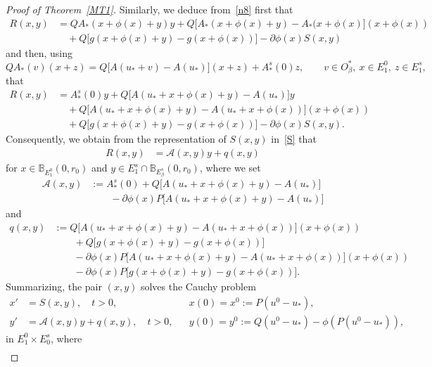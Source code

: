 \documentclass[reqno,11pt]{amsart}
\numberwithin{equation}{section}
\theoremstyle{remark}
\begin{document}
\begin{proof}[Proof of Theorem~\ref{MT1}]
Similarly, we deduce from~\eqref{n8} first that
\begin{align*}
R(x,y)&=Q A_*(x+\phi(x)+y)y+Q\big[A_*(x+\phi(x)+y)-A_*(x+\phi(x)\big](x+\phi(x))\\
&\quad+Q\big[g(x+\phi(x)+y)-g(x+\phi(x))\big]-\partial\phi(x) S(x,y)
\end{align*}
and then, using 
$$
QA_*(v)(x+z)=Q\big[A(u_*+v)-A(u_*)\big](x+z)+A_*^s(0)z, \qquad v\in O_\beta^*,\ x\in E_1^0, \ z\in E_1^s,
$$
 that
\begin{align*}
R(x,y)&=A_*^s(0)y+Q\big[A(u_*+x+\phi(x)+y)-A(u_*)\big]y\\
&\quad+Q\big[A(u_*+x+\phi(x)+y)-A(u_*+x+\phi(x))\big](x+\phi(x))\\
&\quad+Q\big[g(x+\phi(x)+y)-g(x+\phi(x))\big]-\partial\phi(x) S(x,y).
\end{align*}
Consequently, we obtain from the representation of $S(x,y)$ in~\eqref{S} that
\begin{align*}
R(x,y)&=\mathcal{A}(x,y)y+q(x,y)
\end{align*}
for $x\in \mathbb{B}_{E_1^0}(0,r_0)$ and  $y\in E_1^s\cap\mathbb{B}_{E_\beta^s}(0,r_0)$,
where we set
\begin{equation}\label{mcA}
\begin{split}
\mathcal{A}(x,y)&:=A_*^s(0)+Q\big[A(u_*+x+\phi(x)+y)-A(u_*)\big]\\
&\qquad -\partial\phi(x)P\big[A(u_*+x+\phi(x)+y)-A(u_*)\big]
\end{split}
\end{equation}
and
\begin{equation}\label{q}
\begin{split}
q(x,y)&:=Q\big[A(u_*+x+\phi(x)+y)-A(u_*+x+\phi(x))\big](x+\phi(x))\\
&\qquad+Q\big[g(x+\phi(x)+y)-g(x+\phi(x))\big]\\
&\qquad -\partial\phi(x) P\big[A(u_*+x+\phi(x)+y)-A(u_*+x+\phi(x))\big](x+\phi(x))\\
&\qquad -\partial\phi(x)P\big[g(x+\phi(x)+y)-g(x+\phi(x))\big].
\end{split}
\end{equation}
Summarizing,  the pair $(x,y)$ solves the Cauchy problem 
\begin{align}
x'&=S(x,y), \quad t>0,   && x(0)=x^0:= P(u^0-u_*),\label{xeqs}\\
y'&=\mathcal{A}(x,y)y+q(x,y), \quad   t>0, && y(0)=y^0:=Q(u^0-u_*)-\phi(P(u^0-u_*)),\label{yeqs}
\end{align}
in $E_1^0\times E_0^s$, where
\begin{align*}

\end{align*}
\end{proof}
\end{document}
